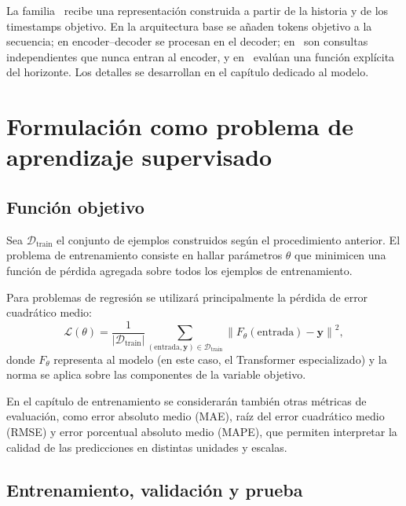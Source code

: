 La familia \CTTransformer\ recibe una representación construida a partir de la historia y de los timestamps objetivo. En la arquitectura base se añaden tokens objetivo a la secuencia; en encoder--decoder se procesan en el decoder; en \QueryCross\ son consultas independientes que nunca entran al encoder, y en \ContinuousBasis\ evalúan una función explícita del horizonte. Los detalles se desarrollan en el capítulo dedicado al modelo.

\section{Formulación como problema de aprendizaje supervisado}

\subsection{Función objetivo}

Sea $\mathcal{D}_{\text{train}}$ el conjunto de ejemplos construidos según el procedimiento anterior. El problema de entrenamiento consiste en hallar parámetros $\theta$ que minimicen una función de pérdida agregada sobre todos los ejemplos de entrenamiento.

\hfill

Para problemas de regresión se utilizará principalmente la pérdida de error cuadrático medio:
\begin{equation}
    \mathcal{L}(\theta)
    = \frac{1}{|\mathcal{D}_{\text{train}}|}
      \sum_{(\text{entrada}, \mathbf{y}) \in \mathcal{D}_{\text{train}}}
      \left\|F_\theta(\text{entrada}) - \mathbf{y}\right\|^2,
\end{equation}
donde $F_\theta$ representa al modelo (en este caso, el Transformer especializado) y la norma se aplica sobre las componentes de la variable objetivo.

\hfill

En el capítulo de entrenamiento se considerarán también otras métricas de evaluación, como error absoluto medio (MAE), raíz del error cuadrático medio (RMSE) y error porcentual absoluto medio (MAPE), que permiten interpretar la calidad de las predicciones en distintas unidades y escalas.

\subsection{Entrenamiento, validación y prueba}

